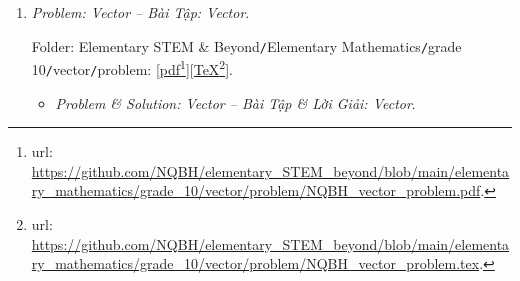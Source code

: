 \documentclass[12pt]{article}
\begin{document}
\begin{enumerate}
\begin{itemize}
		Folder: {\sf Elementary STEM \& Beyond{\tt/}Elementary Mathematics{\tt/}grade 10{\tt/}trigonometry{\tt/}solution}: [\href{https://github.com/NQBH/elementary_STEM_beyond/blob/main/elementary_mathematics/grade_10/trigonometry/solution/NQBH_trigonometry_solution.pdf}{pdf}\footnote{{\sc url}: \url{https://github.com/NQBH/elementary_STEM_beyond/blob/main/elementary_mathematics/grade_10/trigonometry/solution/NQBH_trigonometry_solution.pdf}.}][\href{https://github.com/NQBH/elementary_STEM_beyond/blob/main/elementary_mathematics/grade_10/trigonometry/solution/NQBH_trigonometry_solution.tex}{\TeX}\footnote{{\sc url}: \url{https://github.com/NQBH/elementary_STEM_beyond/blob/main/elementary_mathematics/grade_10/trigonometry/solution/NQBH_trigonometry_solution.tex}.}].
	\end{itemize}
	{\it A bridge between Elementary Algebra \& Elementary Geometric $+$ Trigonometric -- Nhịp cầu nối giữa Đại Số Sơ Cấp với Hình Học Sơ Cấp \& Lượng giác}: Các yếu tố hình học \& lượng giác của tam giác, e.g., cạnh $a,b,c$, đường cao $h_a,h_b,h_c$, đường trung tuyến $m_a,m_b,m_c$, đường phân giác trong $l_a,l_b,l_c$, các bán kính đường tròn nội tiếp $r$, ngoại tiếp $R$, bàng tiếp $r_a,r_b,r_c,\ldots$ \& các tỷ số lượng giác $\sin,\cos,\tan,\cot,\ldots$ các góc $\angle A,\angle B,\angle C$ của tam giác, chính là các nghiệm của phương trình bậc 3 (3rd-degree polynomial equation or cubic equation) mà các hệ số phụ thuộc vào 3 yếu tố cơ bản $p,R,r$, lần lượt là nửa chu vi, bán kính đường tròn ngoại tiếp, nội tiếp của tam giác, see \cite{Phuong_Quan_ptb3_htl}.
	\item {\it Problem: Vector -- Bài Tập: Vector}.
	
	Folder: {\sf Elementary STEM \& Beyond{\tt/}Elementary Mathematics{\tt/}grade 10{\tt/}vector{\tt/}problem}: [\href{https://github.com/NQBH/elementary_STEM_beyond/blob/main/elementary_mathematics/grade_10/vector/problem/NQBH_vector_problem.pdf}{pdf}\footnote{{\sc url}: \url{https://github.com/NQBH/elementary_STEM_beyond/blob/main/elementary_mathematics/grade_10/vector/problem/NQBH_vector_problem.pdf}.}][\href{https://github.com/NQBH/elementary_STEM_beyond/blob/main/elementary_mathematics/grade_10/vector/problem/NQBH_vector_problem.tex}{\TeX}\footnote{{\sc url}: \url{https://github.com/NQBH/elementary_STEM_beyond/blob/main/elementary_mathematics/grade_10/vector/problem/NQBH_vector_problem.tex}.}].
	\begin{itemize}
		\item {\it Problem \& Solution: Vector -- Bài Tập \& Lời Giải: Vector}.
		

\end{itemize}
\end{enumerate}
\end{document}
